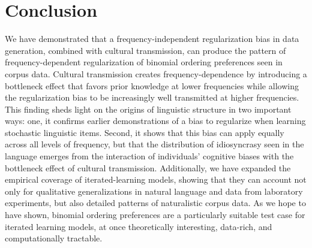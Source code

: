 \documentclass{evolang11}
\begin{document}
\section{Conclusion}
\label{sec:conclusion}
%
We have demonstrated that a frequency-independent regularization bias in data generation, combined with cultural transmission, can produce the pattern of frequency-dependent regularization of binomial ordering preferences seen in corpus data. Cultural transmission creates frequency-dependence by introducing a bottleneck effect that favors prior knowledge at lower frequencies while allowing the regularization bias to be increasingly well transmitted at higher frequencies. This finding sheds light on the origins of linguistic structure in two important ways: one, it confirms earlier demonstrations of a bias to regularize when learning stochastic linguistic items. Second, it shows that this bias can apply equally across all levels of frequency, but that the distribution of idiosyncrasy seen in the language emerges from the interaction of individuals' cognitive biases with the bottleneck effect of cultural transmission. Additionally, we have expanded the empirical coverage of iterated-learning models, showing that they can account not only for qualitative generalizations in natural language and data from laboratory experiments, but also detailed patterns of naturalistic corpus data.  As we hope to have shown, binomial ordering preferences are a particularly suitable test case for iterated learning models, at once theoretically interesting, data-rich, and computationally tractable.

%
%  
%
%
%
%  
\end{document}
